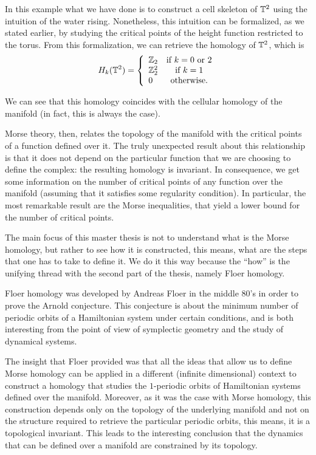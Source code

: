 In this example what we have done is to construct a cell skeleton of $\mathbb{T}^2$ using the intuition of the water rising. Nonetheless, this intuition can be formalized, as we stated earlier, by studying the critical points of the height function restricted to the torus. From this formalization, we can retrieve the homology of $\mathbb{T}^2$, which is
\[H_k(\mathbb{T}^2) = \left\{ \begin{array}{lc} \mathbb{Z}_2 & \text{if } k=0 \text{ or } 2 \\ \mathbb{Z}_2^2 & \text{if } k=1 \\ 0 & \text{otherwise.} \end{array} \right.\]

We can see that this homology coincides with the cellular homology of the manifold (in fact, this is always the case).

Morse theory, then, relates the topology of the manifold with the critical points of a function defined over it. The truly unexpected result about this relationship is that it does not depend on the particular function that we are choosing to define the complex: the resulting homology is invariant. In consequence, we get some information on the number of critical points of any function over the manifold (assuming that it satisfies some regularity condition). In particular, the most remarkable result are the Morse inequalities, that yield a lower bound for the number of critical points.

The main focus of this master thesis is not to understand what is the Morse homology, but rather to see how it is constructed, this means, what are the steps that one has to take to define it. We do it this way because the “how” is the unifying thread with the second part of the thesis, namely Floer homology.

Floer homology was developed by Andreas Floer in the middle 80's in order to prove the Arnold conjecture. This conjecture is about the minimum number of periodic orbits of a Hamiltonian system under certain conditions, and is both interesting from the point of view of symplectic geometry and the study of dynamical systems.

The insight that Floer provided was that all the ideas that allow us to define Morse homology can be applied in a different (infinite dimensional) context to construct a homology that studies the $1$-periodic orbits of Hamiltonian systems defined over the manifold. Moreover, as it was the case with Morse homology, this construction depends only on the topology of the underlying manifold and not on the structure required to retrieve the particular periodic orbits, this means, it is a topological invariant. This leads to the interesting conclusion that the dynamics that can be defined over a manifold are constrained by its topology.

